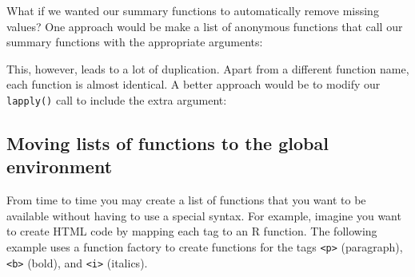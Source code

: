 What if we wanted our summary functions to automatically remove missing
values? One approach would be make a list of anonymous functions that
call our summary functions with the appropriate arguments:

\begin{Shaded}
\begin{Highlighting}[]
\StringTok{ }\NormalTok{(}
    \NormalTok{),}
    \NormalTok{),}
    \NormalTok{)}
\NormalTok{)}
\CommentTok{#> }
\CommentTok{#> }
\end{Highlighting}
\end{Shaded}

This, however, leads to a lot of duplication. Apart from a different
function name, each function is almost identical. A better approach
would be to modify our \texttt{lapply()} call to include the extra
argument:

\begin{Shaded}
\begin{Highlighting}[]
 \NormalTok{))}
\end{Highlighting}
\end{Shaded}

\subsection{Moving lists of functions to the global environment}

From time to time you may create a list of functions that you want to be
available without having to use a special syntax. For example, imagine
you want to create HTML code by mapping each tag to an R function. The
following example uses a function factory to create functions for the
tags \texttt{\textless{}p\textgreater{}} (paragraph),
\texttt{\textless{}b\textgreater{}} (bold), and
\texttt{\textless{}i\textgreater{}} (italics).

